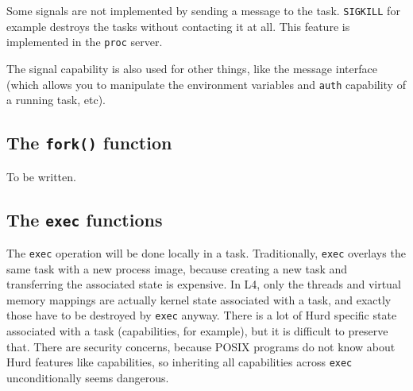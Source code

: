 \begin{comment}
  The \texttt{proc} server can not hold the signal capability itself,
  as it used to do in the implementation on Mach, as it does not trust
  the tasks implementing the capability.  But this is not a problem,
  as the sender and receiver of a signal can negotiate and bootstrap
  the connection without any further support by the \texttt{proc}
  server.
  
  Also, the \texttt{proc} server can not even hold task info caps to
  support the sender of a signal in bootstrapping the connection.
  This means that there is a race between looking up the signal thread
  ID from the PID in the \texttt{proc} server and acquiring a task
  info cap for the task ID of the signal receiver in the sender.
  However, in Unix, there is always a race when sending a signal using
  \verb/kill/.  The task server helps the users a bit here by not
  reusing task IDs as long as possible.
\end{comment}

Some signals are not implemented by sending a message to the task.
\verb/SIGKILL/ for example destroys the tasks without contacting it at
all.  This feature is implemented in the \texttt{proc} server.

The signal capability is also used for other things, like the message
interface (which allows you to manipulate the environment variables
and \texttt{auth} capability of a running task, etc).


\subsection{The \texttt{fork()} function}

To be written.


\subsection{The \texttt{exec} functions}
\label{exec}

The \texttt{exec} operation will be done locally in a task.
Traditionally, \texttt{exec} overlays the same task with a new
process image, because creating a new task and transferring the
associated state is expensive.  In L4, only the threads and virtual
memory mappings are actually kernel state associated with a task, and
exactly those have to be destroyed by \texttt{exec} anyway.  There
is a lot of Hurd specific state associated with a task (capabilities,
for example), but it is difficult to preserve that.  There are
security concerns, because POSIX programs do not know about Hurd
features like capabilities, so inheriting all capabilities across
\texttt{exec} unconditionally seems dangerous.

